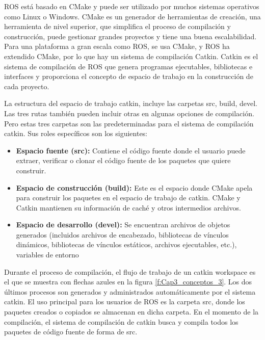                \newpage
               
            ROS está basado en CMake y puede ser utilizado por muchos sistemas operativos como Linux o Windows. CMake es un generador de herramientas de creación, una herramienta de nivel superior, que simplifica el proceso de compilación y construcción, puede gestionar grandes proyectos y tiene una buena escalabilidad. Para una plataforma a gran escala como ROS, se usa CMake, y ROS ha extendido CMake, por lo que hay un sistema de compilación Catkin. Catkin es el sistema de compilación de ROS que genera programas ejecutables, bibliotecas e interfaces y proporciona el concepto de espacio de trabajo en la construcción de cada proyecto.
            
            La estructura del espacio de trabajo catkin, incluye las carpetas src, build, devel. Las tres rutas también pueden incluir otras en algunas opciones de compilación. Pero estas tres carpetas son las predeterminadas para el sistema de compilación catkin. Sus roles específicos son los siguientes:

            \begin{itemize}
                \item {\textbf{Espacio fuente (src):} Contiene el código fuente donde el usuario puede extraer, verificar o clonar el código fuente de los paquetes que quiere construir.}
                \item {\textbf{Espacio de construcción (build):} Este es el espacio donde CMake apela para construir los paquetes en el espacio de trabajo de catkin. CMake y Catkin mantienen su información de caché y otros intermedios archivos.}
                \item {\textbf{Espacio de desarrollo (devel):} Se encuentran archivos de objetos generados (incluidos archivos de encabezado, bibliotecas de vínculos dinámicos, bibliotecas de vínculos estáticos, archivos ejecutables, etc.), variables de entorno}
            \end{itemize}


            Durante el proceso de compilación, el flujo de trabajo de un catkin workspace es el que se muestra con flechas azules en la figura \ref{f:Cap3_conceptos_3}. Los dos últimos procesos son generados y administrados automáticamente por el sistema catkin. El uso principal para los usuarios de ROS es la carpeta src\/, donde los paquetes creados o copiados se almacenan en dicha carpeta. En el momento de la compilación, el sistema de compilación de catkin busca y compila todos los paquetes de código fuente de forma de src\/.

